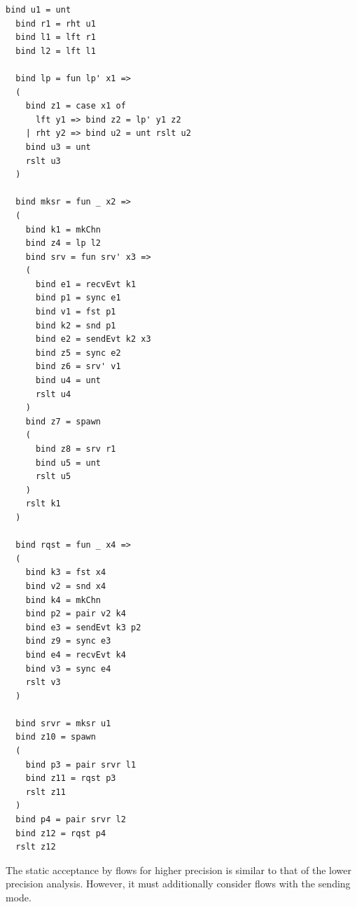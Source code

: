 \documentclass[10pt]{article}
\begin{document}
\begin{lstlisting}[language=normal_lang, mathescape]
  bind u1 = unt
  bind r1 = rht u1
  bind l1 = lft r1
  bind l2 = lft l1

  bind lp = fun lp' x1 => 
  (
    bind z1 = case x1 of 
      lft y1 => bind z2 = lp' y1 z2
    | rht y2 => bind u2 = unt rslt u2
    bind u3 = unt
    rslt u3
  )

  bind mksr = fun _ x2 => 
  (
    bind k1 = mkChn
    bind z4 = lp l2
    bind srv = fun srv' x3 =>
    (
      bind e1 = recvEvt k1
      bind p1 = sync e1
      bind v1 = fst p1
      bind k2 = snd p1 
      bind e2 = sendEvt k2 x3
      bind z5 = sync e2
      bind z6 = srv' v1
      bind u4 = unt
      rslt u4
    )
    bind z7 = spawn
    (
      bind z8 = srv r1
      bind u5 = unt
      rslt u5
    )
    rslt k1
  )

  bind rqst = fun _ x4 =>
  (
    bind k3 = fst x4
    bind v2 = snd x4
    bind k4 = mkChn
    bind p2 = pair v2 k4
    bind e3 = sendEvt k3 p2
    bind z9 = sync e3
    bind e4 = recvEvt k4
    bind v3 = sync e4
    rslt v3
  )

  bind srvr = mksr u1
  bind z10 = spawn
  ( 
    bind p3 = pair srvr l1
    bind z11 = rqst p3
    rslt z11
  )
  bind p4 = pair srvr l2
  bind z12 = rqst p4
  rslt z12
\end{lstlisting}



The static acceptance by flows for higher precision is similar to that of the lower precision analysis.
However, it must additionally consider flows with the sending mode. 
\end{document}
